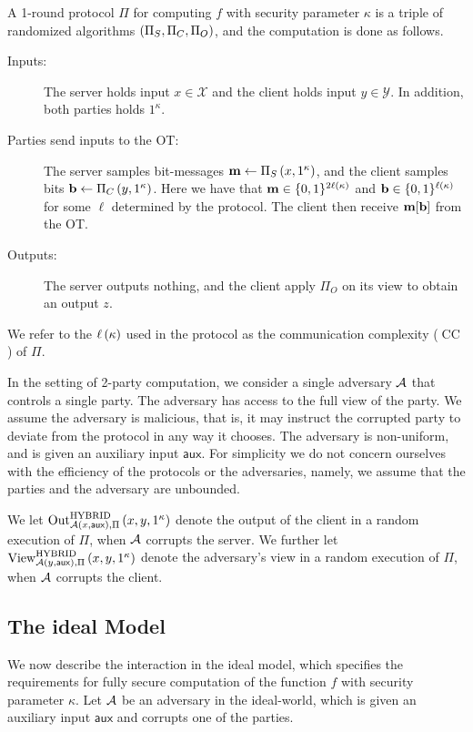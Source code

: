 \documentclass{llncs}
\newcommand{\X}{\mathcal{X}}
\newcommand{\Y}{\mathcal{Y}}
\newcommand{\aux}{\mathsf{aux}}
\newcommand{\HYBRID}{\operatorname{HYBRID}}
\newcommand{\Out}{\operatorname{Out}}
\newcommand{\View}{\operatorname{View}}
\newcommand{\CC}{\operatorname{CC}}
\begin{document}
A 1-round protocol $\Pi$ for computing $f$ with security parameter $\kappa$ is a triple of randomized algorithms $\left ( \Pi_S,\Pi_C,\Pi_O \right )$, and the computation is done as follows.
\begin{description}
\item[Inputs:] The server holds input $x\in\X$ and the client holds input $y\in\Y$. In addition, both parties holds $1^{\kappa}$.

\item[Parties send inputs to the OT:] The server samples bit-messages ${\bf m}\leftarrow\Pi_S\left ( x,1^{\kappa} \right )$, and the client samples bits ${\bf b}\leftarrow\Pi_C\left ( y,1^{\kappa} \right )$. Here we have that ${\bf m}\in\{0,1\}^{2\ell\left ( \kappa \right )}$ and ${\bf b}\in\{0,1\}^{\ell\left ( \kappa \right )}$ for some $\ell$ determined by the protocol. The client then receive ${\bf m}[{\bf b}]$ from the OT.

\item[Outputs:] The server outputs nothing, and the client apply $\Pi_O$ on its view to obtain an output $z$.
\end{description}

We refer to the $\ell\left ( \kappa \right )$ used in the protocol as the communication complexity ($\CC$) of $\Pi$.

In the setting of 2-party computation, we consider a single adversary $\mathcal{A}$ that controls a single party. The adversary has access to the full view of the party. We assume the adversary is malicious, that is, it may instruct the corrupted party to deviate from the protocol in any way it chooses. The adversary is non-uniform, and is given an auxiliary input $\aux$. %
For simplicity we do not concern ourselves with the efficiency of the protocols or the adversaries, namely, we assume that the parties and the adversary are unbounded.

We let $\Out^{\HYBRID}_{\adv\of{x,\aux},\Pi}\of{x,y,1^{\kappa}}$ denote the output of the client in a random execution of $\Pi$, when $\mathcal{A}$ corrupts the server. We further let $\View^{\HYBRID}_{\adv\of{y,\aux},\Pi}\of{x,y,1^{\kappa}}$ denote the adversary's view in a random execution of $\Pi$, when $\mathcal{A}$ corrupts the client.


\subsection*{The ideal Model}
We now describe the interaction in the ideal model, which specifies the requirements for fully secure computation of the function $f$ with security parameter $\kappa$. Let $\mathcal{A}$ be an adversary in the ideal-world, which is given an auxiliary input $\aux$ and corrupts one of the parties.
\end{document}
